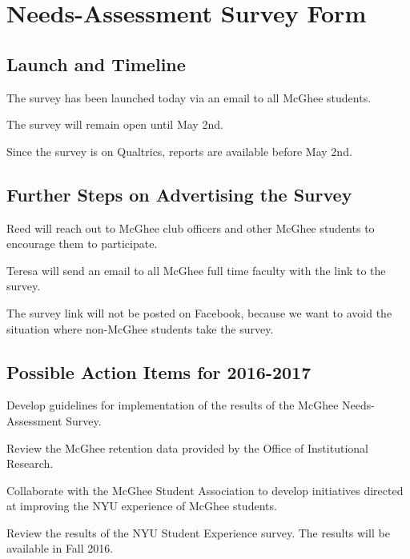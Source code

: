 \documentclass[10pt]{meetingmins}
\begin{document}
\maketitle

\section{Needs-Assessment Survey Form}
\subsection{Launch and Timeline}
\begin{subitems}
	\item The survey has been launched today via an email to all McGhee students.
\item The survey will remain open until May 2nd.
	\item Since the survey is on Qualtrics, reports are available before May 2nd.
\end{subitems}
\subsection{Further Steps on Advertising the Survey} 
\begin{subsubitems}
	\item Reed will reach out to McGhee club officers and other McGhee students to encourage them to participate. 
	\item Teresa  will send  an email to all McGhee full time faculty with the link to the survey.
	\item The survey link will not be posted on Facebook, because we want to avoid the situation where non-McGhee students take the survey.
\end{subsubitems}

\subsection{Possible Action Items for 2016-2017} 
\begin{subsubitems}
 \item Develop guidelines for implementation of the results of the McGhee Needs-Assessment Survey.
\item Review the McGhee retention data provided by the Office of Institutional Research.
\item Collaborate with the McGhee Student Association to develop initiatives directed at improving the NYU experience of McGhee students.
\item Review the results of the NYU Student Experience survey. The results will be available in Fall 2016.
\end{subsubitems} 
\end{document}
